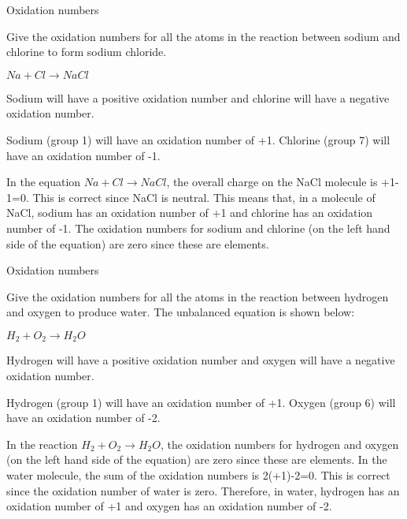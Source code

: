 \begin{wex}{Oxidation numbers\\}{Give the oxidation numbers for all the atoms in the reaction between sodium and chlorine to form sodium chloride.

\begin{center}
\rm${Na + Cl \rightarrow NaCl}$
\end{center}
}

{
Sodium will have a positive oxidation number and chlorine will have a negative oxidation number.\\}

{
Sodium (group 1) will have an oxidation number of +1. Chlorine (group 7) will have an oxidation number of -1. \\}

{
In the equation \rm${Na + Cl \rightarrow NaCl}$, the overall charge on the NaCl molecule is +1-1=0. This is correct since NaCl is neutral. This means that, in a molecule of NaCl, sodium has an oxidation number of +1 and chlorine has an oxidation number of -1. The oxidation numbers for sodium and chlorine (on the left hand side of the equation) are zero since these are elements.
}
\end{wex}

\begin{wex}{Oxidation numbers\\}{Give the oxidation numbers for all the atoms in the reaction between hydrogen and oxygen to produce water. The unbalanced equation is shown below:

\begin{center}
\rm${H_{2} + O_{2} \rightarrow H_{2}O}$
\end{center}
}

{
Hydrogen will have a positive oxidation number and oxygen will have a negative oxidation number.\\}

{
Hydrogen (group 1) will have an oxidation number of +1. Oxygen (group 6) will have an oxidation number of -2. \\}

{
In the reaction \rm${H_{2} + O_{2} \rightarrow H_{2}O}$, the oxidation numbers for hydrogen and oxygen (on the left hand side of the equation) are zero since these are elements. In the water molecule, the sum of the oxidation numbers is 2(+1)-2=0. This is correct since the oxidation number of water is zero. Therefore, in water, hydrogen has an oxidation number of +1 and oxygen has an oxidation number of -2.
}
\end{wex}

